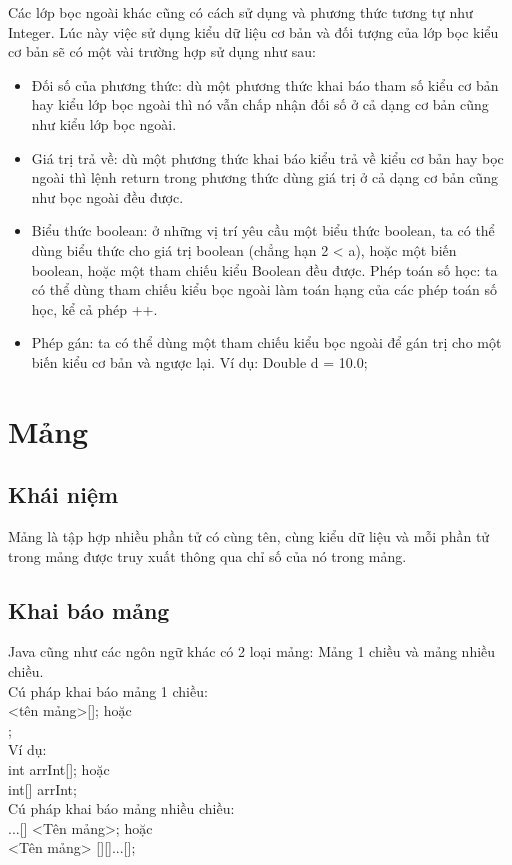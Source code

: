 \indent Các lớp bọc ngoài khác cũng có cách sử dụng và phương thức tương tự như {\ttfamily Integer}. Lúc này việc sử dụng kiểu dữ liệu cơ bản và đối tượng của lớp bọc kiểu cơ bản sẽ có một vài trường hợp sử dụng như sau:
\begin{itemize}
\item Đối số của phương thức: dù một phương thức khai báo tham số kiểu cơ bản hay kiểu lớp bọc ngoài thì nó vẫn chấp nhận đối số ở cả dạng cơ bản cũng như kiểu lớp bọc ngoài.
\item Giá trị trả về: dù một phương thức khai báo kiểu trả về kiểu cơ bản hay bọc ngoài thì lệnh return trong phương thức dùng giá trị ở cả dạng cơ bản cũng như bọc ngoài đều được.
\item Biểu thức boolean: ở những vị trí yêu cầu một biểu thức boolean, ta có thể dùng biểu thức cho giá trị boolean (chẳng hạn 2 < a), hoặc một biến boolean, hoặc một tham chiếu kiểu Boolean đều được. Phép toán số học: ta có thể dùng tham chiếu kiểu bọc ngoài làm toán hạng của các phép toán số học, kể cả phép ++. 
\item Phép gán: ta có thể dùng một tham chiếu kiểu bọc ngoài để gán trị cho một biến kiểu cơ bản và ngược lại. Ví dụ: {\ttfamily Double d = 10.0;}
\end{itemize}
\section{Mảng}
\subsection{Khái niệm}
\indent Mảng là tập hợp nhiều phần tử có cùng tên, cùng kiểu dữ liệu và mỗi phần tử trong mảng được truy xuất thông qua chỉ số của nó trong mảng.
\subsection {Khai báo mảng}
\indent Java cũng như các ngôn ngữ khác có 2 loại mảng: Mảng 1 chiều và mảng nhiều chiều.\\
\indent Cú pháp khai báo mảng 1 chiều:\\
{ <tên mảng>[];} hoặc\\
 {;}\\
\indent Ví dụ:\\
{\ttfamily int arrInt[];} hoặc\\
 {\ttfamily int[] arrInt;}\\
\indent Cú pháp khai báo mảng nhiều chiều:\\
{...[] <Tên mảng>;} hoặc\\
{ <Tên mảng> [][]...[];}\\

